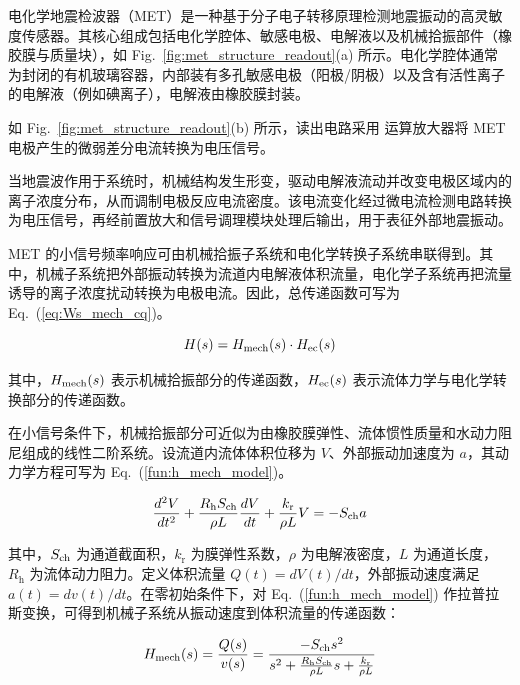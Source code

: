 \documentclass[sn-nature]{sn-jnl}
\newif\ifCNENEnglish
\newif\ifCNENBilingual
\newcommand{\CNEN}[2]{%
    \ifCNENBilingual
        #1%
        \if\relax\detokenize{#2}\relax\else\par #2\fi%
    \else
        \ifCNENEnglish
            #2%
        \else
            #1%
        \fi
    \fi
}
\newcommand{\kr}{k_{\text{r}}} %
\begin{document}
\CNEN{电化学地震检波器（MET）是一种基于分子电子转移原理检测地震振动的高灵敏度传感器。其核心组成包括电化学腔体、敏感电极、电解液以及机械拾振部件（橡胶膜与质量块），如 Fig.~\ref{fig:met_structure_readout}(a) 所示。电化学腔体通常为封闭的有机玻璃容器，内部装有多孔敏感电极（阳极/阴极）以及含有活性离子的电解液（例如碘离子），电解液由橡胶膜封装。}{}

\CNEN{如 Fig.~\ref{fig:met_structure_readout}(b) 所示，读出电路采用 \valReadoutAmplifier{} 运算放大器将 MET 电极产生的微弱差分电流转换为电压信号。}{}

\CNEN{当地震波作用于系统时，机械结构发生形变，驱动电解液流动并改变电极区域内的离子浓度分布，从而调制电极反应电流密度。该电流变化经过微电流检测电路转换为电压信号，再经前置放大和信号调理模块处理后输出，用于表征外部地震振动。}{}

\CNEN{MET 的小信号频率响应可由机械拾振子系统和电化学转换子系统串联得到\cite{WOS:000318036400036}。其中，机械子系统把外部振动转换为流道内电解液体积流量，电化学子系统再把流量诱导的离子浓度扰动转换为电极电流。因此，总传递函数可写为 Eq.~(\ref{eq:Ws_mech_cq})。}{}

\begin{equation}\label{eq:Ws_mech_cq}
    H(s)  = H_{\rm mech}(s) \cdot H_{\rm ec}(s)
\end{equation}

\CNEN{其中，$H_{\rm mech}(s)$ 表示机械拾振部分的传递函数，$H_{\rm ec}(s)$ 表示流体力学与电化学转换部分的传递函数。}{}

\CNEN{在小信号条件下，机械拾振部分可近似为由橡胶膜弹性、流体惯性质量和水动力阻尼组成的线性二阶系统。设流道内流体体积位移为 $V$、外部振动加速度为 $a$，其动力学方程可写为 Eq.~(\ref{fun:h_mech_model})。}{}

\begin{equation}
    \frac{d^2 V}{dt^2} + \frac{R_{\text{h}} S_{\rm ch}}{\rho L} \frac{dV}{dt} + \frac{\kr}{\rho L} V = -S_{\rm ch} a
    \label{fun:h_mech_model}
\end{equation}

\CNEN{其中，$S_{\rm ch}$ 为通道截面积，$\kr$ 为膜弹性系数，$\rho$ 为电解液密度，$L$ 为通道长度，$R_{\text{h}}$ 为流体动力阻力\cite{agafonov2015}。定义体积流量 $Q(t)=dV(t)/dt$，外部振动速度满足 $a(t)=dv(t)/dt$。在零初始条件下，对 Eq.~(\ref{fun:h_mech_model}) 作拉普拉斯变换，可得到机械子系统从振动速度到体积流量的传递函数：}{}

\begin{equation}
    H_{\rm mech}(s)  = \frac{Q(s)}{v(s)} = \frac{- S_{\rm ch} s^2}{s^2 + \frac{R_{\text{h}} S_{\rm ch}}{\rho L}s + \frac{\kr}{\rho L }}
    \label{fun:h_mech_transfer}
\end{equation}
\end{document}
